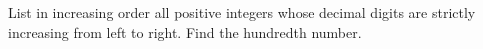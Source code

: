 List in increasing order all positive integers whose decimal digits are strictly increasing from left to right. Find the hundredth number.
